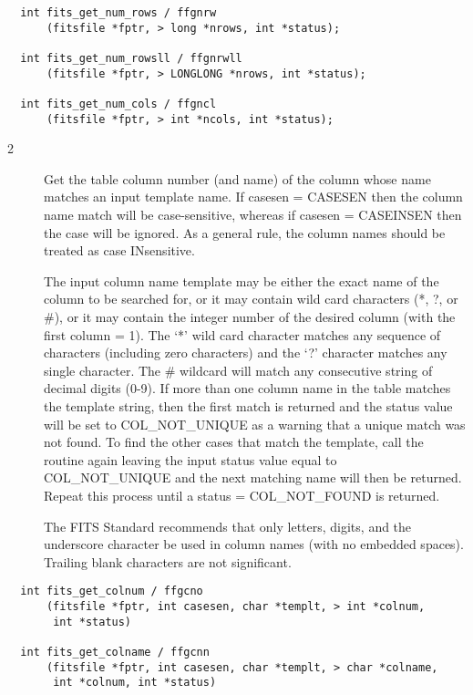 \documentclass[11pt]{book}
\begin{document}
\begin{verbatim}
  int fits_get_num_rows / ffgnrw
      (fitsfile *fptr, > long *nrows, int *status);

  int fits_get_num_rowsll / ffgnrwll
      (fitsfile *fptr, > LONGLONG *nrows, int *status);

  int fits_get_num_cols / ffgncl
      (fitsfile *fptr, > int *ncols, int *status);
\end{verbatim}


\begin{description}
\item[2 ] Get the table column number (and name) of the column whose name
matches an input template name.   If casesen  = CASESEN then the column
name match will be case-sensitive, whereas if casesen = CASEINSEN then
the case will be ignored.  As a general rule, the column names should
be treated as case INsensitive.

The input column name template may be either the exact name of the
column to be searched for, or it may contain wild card characters (*,
?, or \#), or it may contain the integer number of the desired column
(with the first column = 1).  The `*' wild card character matches any
sequence of characters (including zero characters) and the `?'
character matches any single character.  The \# wildcard will match any
consecutive string of decimal digits (0-9).  If more than one column
name in the table matches the template string, then the first match is
returned and the status value will be set to COL\_NOT\_UNIQUE  as a
warning that a unique match was not found.  To find the other cases
that match the template, call the routine again leaving the input
status value equal to COL\_NOT\_UNIQUE and the next matching name will
then be returned.  Repeat this process until a status =
COL\_NOT\_FOUND  is returned.

The FITS Standard recommends that only letters, digits, and the
underscore character be used in column names (with no embedded
spaces).  Trailing blank characters are not significant.
  \label{ffgcno} \label{ffgcnn}
\end{description}

\begin{verbatim}
  int fits_get_colnum / ffgcno
      (fitsfile *fptr, int casesen, char *templt, > int *colnum,
       int *status)

  int fits_get_colname / ffgcnn
      (fitsfile *fptr, int casesen, char *templt, > char *colname,
       int *colnum, int *status)
\end{verbatim}
\end{document}
